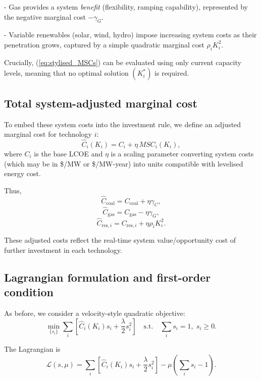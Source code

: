 \documentclass[preprint,authoryear,12pt]{elsarticle}
\begin{document}
- Gas provides a system \emph{benefit} (flexibility, ramping capability), represented by the
  negative marginal cost $-\gamma_G$.

- Variable renewables (solar, wind, hydro) impose increasing system costs as their penetration
  grows, captured by a simple quadratic marginal cost $\rho_i K_i^2$.

Crucially, (\ref{eq:stylised_MSCs}) can be evaluated using only current capacity levels, meaning
that no optimal solution $(K_i^*)$ is required.

\subsection*{Total system-adjusted marginal cost}

To embed these system costs into the investment rule, we define an adjusted marginal cost for
technology $i$:
\begin{equation}
    \widehat{C}_i(K_i)
    = C_i + \eta \, MSC_i(K_i),
    \label{eq:adjusted_cost_no_Kstar}
\end{equation}
where $C_i$ is the base LCOE and $\eta$ is a scaling parameter converting system costs (which
may be in \$/MW or \$/MW-year) into units compatible with levelised energy cost.

Thus,
\[
    \widehat{C}_{\text{coal}} = C_{\text{coal}} + \eta \gamma_C,
\]
\[
    \widehat{C}_{\text{gas}} = C_{\text{gas}} - \eta \gamma_G,
\]
\[
    \widehat{C}_{\text{res},i} = C_{\text{res},i} + \eta \rho_i K_i^2.
\]

These adjusted costs reflect the real-time system value/opportunity cost of further investment
in each technology.

\subsection*{Lagrangian formulation and first-order condition}

As before, we consider a velocity-style quadratic objective:
\begin{equation}
    \min_{\{s_i\}}
    \sum_i \left[
        \widehat{C}_i(K_i) s_i
      + \frac{\lambda}{2} s_i^2
    \right]
    \quad \text{s.t.} \quad \sum_i s_i = 1,\; s_i \ge 0.
    \label{eq:system_cost_velocity_objective}
\end{equation}

The Lagrangian is
\begin{equation}
    \mathcal{L}(s,\mu)
    = \sum_i \left[
        \widehat{C}_i(K_i) s_i
      + \frac{\lambda}{2} s_i^2
    \right]
    - \mu \left( \sum_i s_i - 1 \right).
\end{equation}
\end{document}
